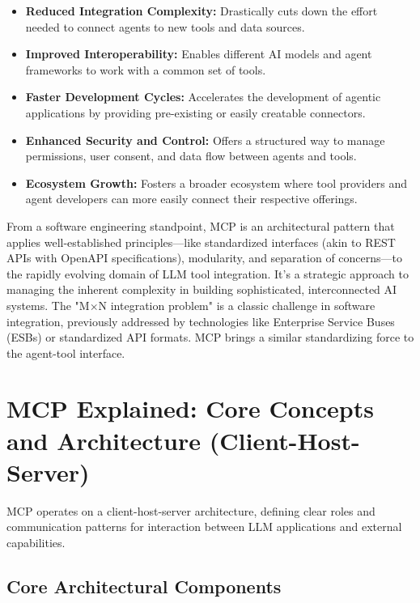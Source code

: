\begin{itemize}
    \item \textbf{Reduced Integration Complexity:} Drastically cuts down the effort needed to connect agents to new tools and data sources.
    \item \textbf{Improved Interoperability:} Enables different AI models and agent frameworks to work with a common set of tools.
    \item \textbf{Faster Development Cycles:} Accelerates the development of agentic applications by providing pre-existing or easily creatable connectors.
    \item \textbf{Enhanced Security and Control:} Offers a structured way to manage permissions, user consent, and data flow between agents and tools.
    \item \textbf{Ecosystem Growth:} Fosters a broader ecosystem where tool providers and agent developers can more easily connect their respective offerings.
\end{itemize}

From a software engineering standpoint, MCP is an architectural pattern that applies well-established principles---like standardized interfaces 
(akin to REST APIs with OpenAPI specifications), modularity, and separation of concerns---to the rapidly evolving domain of LLM tool integration. 
It's a strategic approach to managing the inherent complexity in building sophisticated, interconnected AI systems. 
The "M×N integration problem" is a classic challenge in software integration, previously addressed by technologies like 
Enterprise Service Buses (ESBs) or standardized API formats. MCP brings a similar standardizing force to the agent-tool interface.

\section{MCP Explained: Core Concepts and Architecture (Client-Host-Server)}

MCP operates on a client-host-server architecture, defining clear roles and communication patterns for interaction between 
LLM applications and external capabilities.

\subsection*{Core Architectural Components}


